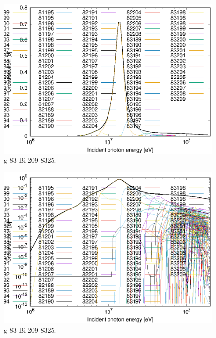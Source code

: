 \begin{figure}
 \includegraphics[width=\linewidth]{eps/g_83-Bi-209_8325.eps}
  \caption{g-83-Bi-209-8325.}
\end{figure}
\begin{figure}
 \includegraphics[width=\linewidth]{eps-log/g_83-Bi-209_8325.eps}
 \caption{g-83-Bi-209-8325.}
\end{figure}
\newpage \clearpage

